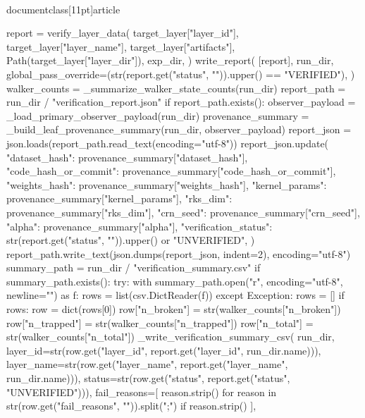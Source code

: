 \\documentclass[11pt]{article}
\begin{document}
\begin{CodeBlock}
        report = verify_layer_data(
            target_layer["layer_id"],
            target_layer["layer_name"],
            target_layer["artifacts"],
            Path(target_layer["layer_dir"]),
            exp_dir,
        )
        write_report(
            [report],
            run_dir,
            global_pass_override=(str(report.get("status", "")).upper() == "VERIFIED"),
        )
        walker_counts = _summarize_walker_state_counts(run_dir)
        report_path = run_dir / "verification_report.json"
        if report_path.exists():
            observer_payload = _load_primary_observer_payload(run_dir)
            provenance_summary = _build_leaf_provenance_summary(run_dir, observer_payload)
            report_json = json.loads(report_path.read_text(encoding="utf-8"))
            report_json.update({
                "dataset_hash": provenance_summary["dataset_hash"],
                "code_hash_or_commit": provenance_summary["code_hash_or_commit"],
                "weights_hash": provenance_summary["weights_hash"],
                "kernel_params": provenance_summary["kernel_params"],
                "rks_dim": provenance_summary["rks_dim"],
                "crn_seed": provenance_summary["crn_seed"],
                "alpha": provenance_summary["alpha"],
                "verification_status": str(report.get("status", "")).upper() or "UNVERIFIED",
            })
            report_path.write_text(json.dumps(report_json, indent=2), encoding="utf-8")
        summary_path = run_dir / "verification_summary.csv"
        if summary_path.exists():
            try:
                with summary_path.open("r", encoding="utf-8", newline="") as f:
                    rows = list(csv.DictReader(f))
            except Exception:
                rows = []
            if rows:
                row = dict(rows[0])
                row["n_broken"] = str(walker_counts["n_broken"])
                row["n_trapped"] = str(walker_counts["n_trapped"])
                row["n_total"] = str(walker_counts["n_total"])
                _write_verification_summary_csv(
                    run_dir,
                    layer_id=str(row.get("layer_id", report.get("layer_id", run_dir.name))),
                    layer_name=str(row.get("layer_name", report.get("layer_name", run_dir.name))),
                    status=str(row.get("status", report.get("status", "UNVERIFIED"))),
                    fail_reasons=[
                        reason.strip()
                        for reason in str(row.get("fail_reasons", "")).split(";")
                        if reason.strip()
                    ],

\end{CodeBlock}
\end{document}
